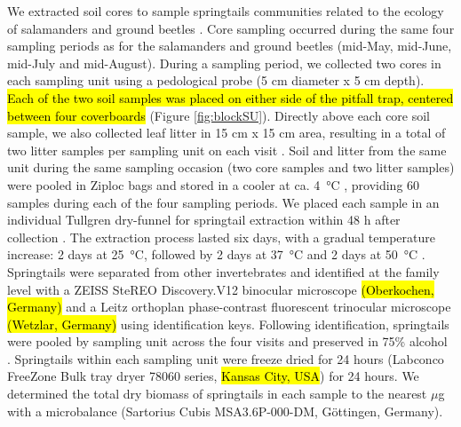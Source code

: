 We extracted soil cores to sample springtails communities related to the ecology of salamanders and ground beetles \citep{edwardsAssessmentPopulationsSoilinhabiting1991,pongeVerticalDistributionCollembola2000,chauvatChangesSoilFaunal2011a,raymond-leonardSpringtailCommunityStructure2018a,rousseauForestFloorMesofauna2018}. 
Core sampling occurred during the same four sampling periods as for the salamanders and ground beetles (mid-May, mid-June, mid-July and mid-August). 
During a sampling period, we collected two cores in each sampling unit using a pedological probe (5 cm diameter x 5 cm depth). 
\hl{Each of the two soil samples was placed on either side of the pitfall trap, centered between four coverboards} (Figure \ref{fig:blockSU}). 
Directly above each core soil sample, we also collected leaf litter in 15 cm x 15 cm area, resulting in a total of two litter samples per sampling unit on each visit \citep{raymond-leonardSpringtailCommunityStructure2018a,rousseauForestFloorMesofauna2018}.  
Soil and litter from the same unit during the same sampling occasion (two core samples and two litter samples) were pooled in Ziploc\up{\texttrademark{}} bags and stored in a cooler at ca. 4 °C \citep{chauvatChangesSoilFaunal2011a,rousseauForestFloorMesofauna2018}, providing 60 samples during each of the four sampling periods. 
We placed each sample in an individual Tullgren dry-funnel for springtail extraction within 48 h after collection \citep{rusekBiodiversityCollembolaTheir1998,wuCompositionSpatiotemporalVariation2014,rousseauForestFloorMesofauna2018}. 
The extraction process lasted six days, with a gradual temperature increase: 2 days at 25 °C, followed by 2 days at 37 °C and 2 days at 50 °C \citep{raymond-leonardSpringtailCommunityStructure2018a}. 
Springtails were separated from other invertebrates and identified at the family level with a ZEISS SteREO Discovery.V12 binocular microscope \hl{(Oberkochen, Germany)} and a Leitz orthoplan phase-contrast fluorescent trinocular microscope \hl{(Wetzlar, Germany)} using \cite{bellingerChecklistCollembolaWorld1996} identification keys. 
Following identification, springtails were pooled by sampling unit across the four visits and preserved in 75\% alcohol \citep{wuCompositionSpatiotemporalVariation2014}. 
Springtails within each sampling unit were freeze dried for 24 hours (Labconco FreeZone Bulk tray dryer 78060 series, \hl{Kansas City, USA}) for 24 hours. 
We determined the total dry biomass of springtails in each sample to the nearest $\mu$g with a microbalance (Sartorius Cubis\up{\texttrademark{}} MSA3.6P-000-DM, Göttingen, Germany).

